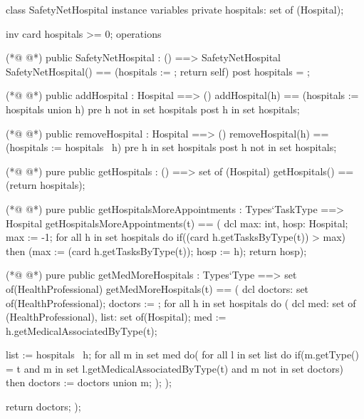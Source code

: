 \begin{vdmpp}[breaklines=true]
class SafetyNetHospital
instance variables
 private hospitals: set of (Hospital);
 
 inv card hospitals >= 0;
operations

(*@
\label{SafetyNetHospital:8}
@*)
 public SafetyNetHospital : () ==> SafetyNetHospital
  SafetyNetHospital() == (hospitals := {}; return self)
 post hospitals = {};
  
(*@
\label{addHospital:12}
@*)
 public addHospital : Hospital ==> ()
  addHospital(h) == (hospitals := hospitals union {h})
 pre h not in set hospitals
 post h in set hospitals;
 
(*@
\label{removeHospital:17}
@*)
 public removeHospital : Hospital ==> ()
  removeHospital(h) == (hospitals := hospitals \ {h})
 pre h in set hospitals
 post h not in set hospitals;
 
(*@
\label{getHospitals:22}
@*)
 pure public getHospitals : () ==> set of (Hospital)
  getHospitals() == (return hospitals);
 
(*@
\label{getHospitalsMoreAppointments:25}
@*)
 pure public getHospitalsMoreAppointments : Types`TaskType ==> Hospital
  getHospitalsMoreAppointments(t) == (
                    dcl max: int, hosp: Hospital;
                    max := -1;
                    for all h in set hospitals do
                     if((card h.getTasksByType(t)) > max)
                      then (max := (card h.getTasksByType(t)); hosp := h);
                    return hosp);
 
(*@
\label{getMedMoreHospitals:34}
@*)
 pure public getMedMoreHospitals : Types`Type ==> set of(HealthProfessional)
  getMedMoreHospitals(t) == (
                  dcl doctors: set of(HealthProfessional);
                  doctors := {};
                  for all h in set hospitals do (
                   dcl med: set of (HealthProfessional), list: set of(Hospital);
                   med := h.getMedicalAssociatedByType(t);
                   
                   list := hospitals \ {h};
                   for all m in set med do(
                    for all l in set list do
                     if(m.getType() = t and m in set l.getMedicalAssociatedByType(t) and m not in set doctors)
                      then doctors := doctors union {m};
                   );
                  );
                  
                  return doctors;
                 );
                               

\end{vdmpp}
